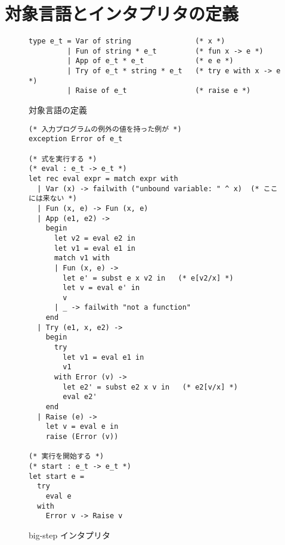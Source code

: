  \section{対象言語とインタプリタの定義}
\label{section:try-with__interpreter}

\begin{figure}
\begin{spacing}{0.8}
\begin{verbatim}
type e_t = Var of string               (* x *)
         | Fun of string * e_t         (* fun x -> e *)
         | App of e_t * e_t            (* e e *)
         | Try of e_t * string * e_t   (* try e with x -> e *)
         | Raise of e_t                (* raise e *)
\end{verbatim}
\end{spacing}
\caption{対象言語の定義}
\label{figure:typee}
\end{figure}

\begin{figure}
\begin{spacing}{0.8}
\begin{verbatim}
(* 入力プログラムの例外の値を持った例が *)
exception Error of e_t

(* 式を実行する *)
(* eval : e_t -> e_t *)
let rec eval expr = match expr with
  | Var (x) -> failwith ("unbound variable: " ^ x)  (* ここには来ない *)
  | Fun (x, e) -> Fun (x, e)
  | App (e1, e2) ->
    begin
      let v2 = eval e2 in
      let v1 = eval e1 in
      match v1 with
      | Fun (x, e) ->
        let e' = subst e x v2 in   (* e[v2/x] *)
        let v = eval e' in
        v
      | _ -> failwith "not a function"
    end
  | Try (e1, x, e2) ->
    begin
      try
        let v1 = eval e1 in
        v1
      with Error (v) ->
        let e2' = subst e2 x v in   (* e2[v/x] *)
        eval e2'
    end
  | Raise (e) ->
    let v = eval e in
    raise (Error (v))

(* 実行を開始する *)
(* start : e_t -> e_t *)
let start e =
  try
    eval e
  with
    Error v -> Raise v
\end{verbatim}
\end{spacing}
\caption{big-step インタプリタ}
\label{figure:interpreter}
\end{figure}



